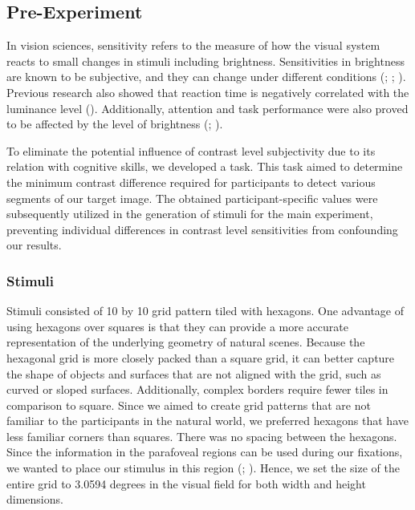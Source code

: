 \documentclass{article}
\begin{document}
\subsection{Pre-Experiment}
\label{preExp}
In vision sciences, sensitivity refers to the measure of how the visual system reacts to small changes in stimuli including brightness. Sensitivities in brightness are known to be subjective, and they can change under different conditions (\cite{buhren2006measuring}; \cite{lesmes2010bayesian}; \cite{koefoed2015contrast}). Previous research also showed that reaction time is negatively correlated with the luminance level (\cite{jaskowski2006task}). Additionally, attention and task performance were also proved to be affected by the level of brightness (\cite{grice1979variable}; \cite{dehghan2017evaluation}).

To eliminate the potential influence of contrast level subjectivity due to its relation with cognitive skills, we developed a task. This task aimed to determine the minimum contrast difference required for participants to detect various segments of our target image. The obtained participant-specific values were subsequently utilized in the generation of stimuli for the main experiment, preventing individual differences in contrast level sensitivities from confounding our results.


\subsubsection{Stimuli}
Stimuli consisted of 10 by 10 grid pattern tiled with hexagons. One advantage of using hexagons over squares is that they can provide a more accurate representation of the underlying geometry of natural scenes. Because the hexagonal grid is more closely packed than a square grid, it can better capture the shape of objects and surfaces that are not aligned with the grid, such as curved or sloped surfaces. Additionally, complex borders require fewer tiles in comparison to square. Since we aimed to create grid patterns that are not familiar to the participants in the natural world, we preferred hexagons that have less familiar corners than squares. There was no spacing between the hexagons. Since the information in the parafoveal regions can be used during our fixations, we wanted to place our stimulus in this region (\cite{rayner1998eye}; \cite{henderson1987effects}). Hence, we set the size of the entire grid to 3.0594 degrees in the visual field for both width and height dimensions. 
\end{document}
